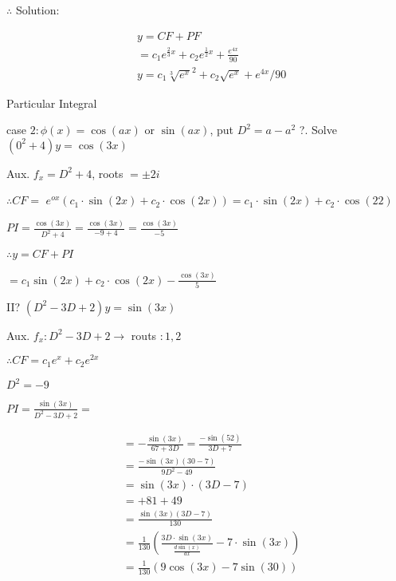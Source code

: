 \documentclass[12pt, a4paper]{article}
\begin{document}
	$\therefore$ Solution:

$$
\begin{aligned}
	 & y=C F+P F                                                           \\
	 & =c_{1} e^{\frac{2}{3} x}+c_{2} e^{\frac{1}{2} x}+\frac{e^{4 x}}{90} \\
	 & y=c_{1}{\sqrt[3]{e^{x}}}^{2}+c_{2} \sqrt{e^{x}}+e^{4 x} / 90
\end{aligned}
$$

	Particular Integral

	case $2: \phi(x)=\cos(a x)$ or $\sin(a x)$, put $D^{2}=a-a^{2}$ ?. Solve $\left(0^{2}+4\right) y=\cos(3 x)$

	Aux. $f_{x}=D^{2}+4$, roots $= \pm 2 i$

	$\therefore C F=$ $e^{o x}\left(c_{1} \cdot \sin(2 x)+c_{2} \cdot \cos(2 x)\right)=c_{1} \cdot \sin(2 x)+c_{2} \cdot \cos(22)$

	$P I=\frac{\cos(3 x)}{D^{2}+4}=\frac{\cos(3 x)}{-9+4}=\frac{\cos(3 x)}{-5}$

	$\therefore y=C F+P I$

	$=c_{1} \sin(2 x)+c_{2} \cdot \cos(2 x)-\frac{\cos(3 x)}{5}$

	II? $\left(D^{2}-3 D+2\right) y=\sin(3 x)$

	Aux. $f_{x}: D^{2}-3 D+2 \rightarrow$ routs $: 1,2$

	$\therefore C F=c_{1} e^{x}+c_{2} e^{2 x}$

	$D^{2}=-9$

	$P I=\frac{\sin(3 x)}{D^{2}-3 D+2}=$

$$
\begin{aligned}
	 & =-\frac{\sin(3 x)}{67+3 D}=\frac{-\sin(52)}{3 D+7}                                             \\
	 & =\frac{-\sin(3 x)(30-7)}{9 D^{2}-49}                                                           \\
	 & =\sin(3 x) \cdot(3 D-7)                                                                        \\
	 & =+81+49                                                                                        \\
	 & =\frac{\sin(3 x)(3 D-7)}{130}                                                                  \\
	 & =\frac{1}{130}\left(\frac{3 D \cdot \sin(3 x)}{\frac{d \sin(x)}{d x}}-7 \cdot \sin(3 x)\right) \\
	 & =\frac{1}{130}(9 \cos(3 x)-7 \sin(30))
\end{aligned}
$$
\end{document}
